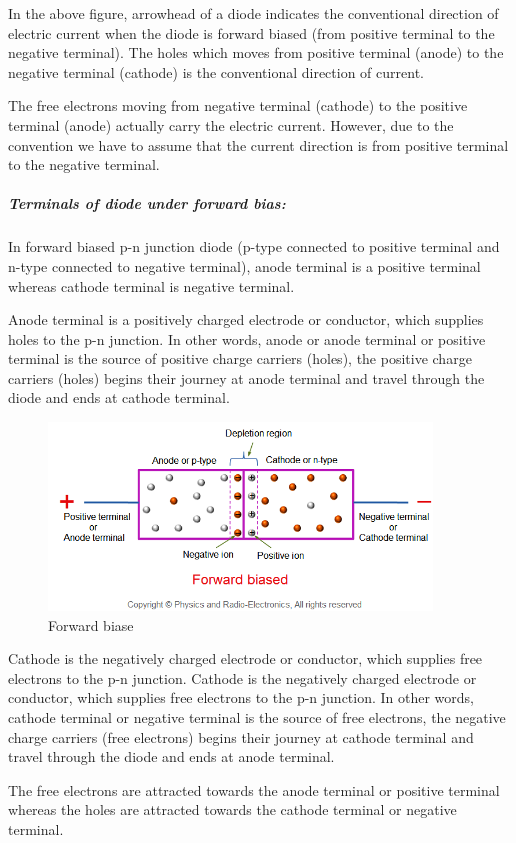 \documentclass{article}
\begin{document}
In the above figure, arrowhead of a diode indicates the conventional direction of electric current when the diode is forward biased (from positive terminal to the negative terminal). The holes which moves from positive terminal (anode) to the negative terminal (cathode) is the conventional direction of current.

The free electrons moving from negative terminal (cathode) to the positive terminal (anode) actually carry the electric current. However, due to the convention we have to assume that the current direction is from positive terminal to the negative terminal.
\subparagraph{\large Terminals of diode under forward bias:}
In forward biased p-n junction diode (p-type connected to positive terminal and n-type connected to negative terminal), anode terminal is a positive terminal whereas cathode terminal is negative terminal.

Anode terminal is a positively charged electrode or conductor, which supplies holes to the p-n junction. In other words, anode or anode terminal or positive terminal is the source of positive charge carriers (holes), the positive charge carriers (holes) begins their journey at anode terminal and travel through the diode and ends at cathode terminal.
\begin{figure}[H]
	\centering
	\includegraphics[height=5cm]{terminalsunderforward.png}
	\caption{Forward biase}
\end{figure}

 Cathode is the negatively charged electrode or conductor, which supplies free electrons to the p-n junction.             
Cathode is the negatively charged electrode or conductor, which supplies free electrons to the p-n junction. In other words, cathode terminal or negative terminal is the source of free electrons, the negative charge carriers (free electrons) begins their journey at cathode terminal and travel through the diode and ends at anode terminal.

The free electrons are attracted towards the anode terminal or positive terminal whereas the holes are attracted towards the cathode terminal or negative terminal.
\end{document}
